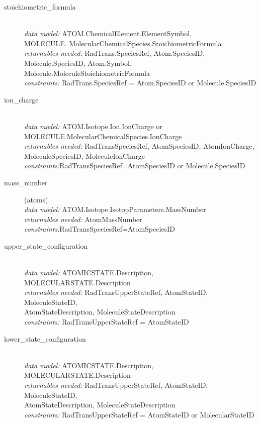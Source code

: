 \documentclass[11pt,a4paper]{ivoa}
\begin{document}
\begin{description}
\item [stoichiometric\_formula] \hfill\\
	\textit{data model:} ATOM.ChemicalElement.ElementSymbol,\\ MOLECULE. 
MolecularChemicalSpecies.StoichiometricFormula\\
	\textit{returnables needed:} RadTrans.SpeciesRef, Atom.SpeciesID, 
Molecule.SpeciesID, Atom.Symbol, Molecule.MoleculeStoichiometricFormula\\
	\textit{constraints:}  RadTrans.SpeciesRef = Atom.SpeciesID or  Molecule.SpeciesID

\item [ion\_charge]\hfill\\
	\textit{data model:} ATOM.Isotope.Ion.IonCharge or 
MOLECULE.MolecularChemicalSpecies.IonCharge \\
	\textit{returnables needed:} RadTransSpeciesRef, AtomSpeciesID, AtomIonCharge, 
MoleculeSpeciesID, MoleculeIonCharge \\
	\textit{constraints:}RadTransSpeciesRef=AtomSpeciesID or  Molecule.SpeciesID

	\item [mass\_number] (atoms)\hfill\\
	\textit{data model:} ATOM.Isotope.IsotopParameters.MassNumber \\
	\textit{returnables needed:} AtomMassNumber\\
	\textit{constraints:}RadTransSpeciesRef=AtomSpeciesID

	\item [upper\_state\_configuration]\hfill\\
	\textit{data model:} ATOMICSTATE.Description, MOLECULARSTATE.Description\\
	\textit{returnables needed:} RadTransUpperStateRef, AtomStateID, 
MoleculeStateID,\\ 
AtomStateDescription, MoleculeStateDescription\\
	\textit{constraints:}  RadTransUpperStateRef = AtomStateID

	\item [lower\_state\_configuration]\hfill\\
	\textit{data model:} ATOMICSTATE.Description, MOLECULARSTATE.Description\\
	\textit{returnables needed:} RadTransUpperStateRef, AtomStateID, 
MoleculeStateID,\\ 
AtomStateDescription, MoleculeStateDescription\\
	\textit{constraints:}  RadTransUpperStateRef = AtomStateID or MolecularStateID
	

\end{description}
\end{document}
